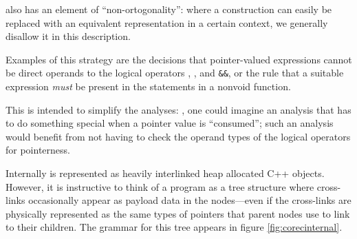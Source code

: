 \begin{docpart}
\coreC also has an element of ``non-ortogonality'': where a
construction can easily be replaced with an equivalent
representation in a certain context, we generally
disallow it in this description.

Examples of this strategy are the decisions that pointer-valued
expressions cannot be direct operands to the logical operators
\syntax{!}, \syntax{||}, and \verb.&&., or the rule that a
suitable expression \emph{must} be present in the 
statements in a nonvoid function.

This is intended to simplify the analyses: \eg, one could imagine
an analysis that has to do something special when a pointer value
is ``consumed''; such an analysis would benefit from not having to
check the operand types of the logical operators for pointerness.

Internally \coreC is represented as heavily interlinked heap
allocated C++ objects. However, it is instructive to think of
a \coreC program as a tree structure where cross-links occasionally
appear as payload data in the nodes---even if the cross-links are
physically represented as the same types of pointers that parent
nodes use to link to their children. The grammar for this tree
appears in figure \ref{fig:corecinternal}.


\end{docpart}
